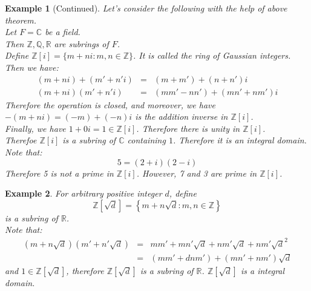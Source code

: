\documentclass{article}
\theoremstyle{MyNonumberplain}
\theoremstyle{break}
\theoremstyle{break}
\newtheorem{example}{Example}[section]
\theoremstyle{break}
\theoremstyle{definition}
\theoremstyle{break}
\begin{document}
\begin{expbox}
    \begin{example}[Continued]
        Let's consider the following with the help of above theorem.\\

        Let $F =\mathbb{C}$ be a field.\\
        
        Then $\mathbb{Z}, \mathbb{Q}, \mathbb{R}$ are subrings of $F$.\\
        
        Define $\mathbb{Z} [i] = \{ m + n i : m, n \in \mathbb{Z} \}$. It is called
        the ring of Gaussian integers. Then we have:
        \begin{eqnarray*}
          (m + n i) + (m' + n' i) & = & (m + m') + (n + n') i\\
          (m + n i) (m' + n' i) & = & (m m' - n n') + (m n' + n m') i
        \end{eqnarray*}
        Therefore the operation is closed, and moreover, we have $- (m + n i) = (- m)
        + (- n) i$ is the addition inverse in $\mathbb{Z} [i]$.\\
        
        Finally, we have $1 + 0 i = 1 \in \mathbb{Z} [i]$. Therefore there is unity in
        $\mathbb{Z} [i]$.\\
        
        Therefoe $\mathbb{Z} [i]$ is a subring of $\mathbb{C}$ containing $1$.
        Therefore it is an integral domain.\\
        
        Note that:
        \[ 5 = (2 + i) (2 - i) \]
        Therefore 5 is not a prime in $\mathbb{Z} [i]$. However, 7 and 3 are prime in
        $\mathbb{Z} [i]$.
    \end{example}
\end{expbox}

\begin{expbox}
    \begin{example}
        For arbitrary positive integer $d$, define
        \[ \mathbb{Z} \left[ \sqrt{d} \right] = \left\{ m + n \sqrt{d} : m, n \in
           \mathbb{Z} \right\} \]
        is a subring of $\mathbb{R}$.\\
        
        Note that:
        \begin{eqnarray*}
          \left( m + n \sqrt{d} \right) \left( m' + n' \sqrt{d} \right) & = & m m' + m
          n' \sqrt{d} + n m' \sqrt{d} + n m' \sqrt{d}^2\\
          & = & (m m' + d n m') + (m n' + n m') \sqrt{d}
        \end{eqnarray*}
        and $1 \in \mathbb{Z} \left[ \sqrt{d} \right]$, therefore $\mathbb{Z} \left[
        \sqrt{d} \right]$ is a subring of $\mathbb{R}$. $\mathbb{Z} \left[ \sqrt{d}
        \right]$ is a integral domain.
    \end{example}
\end{expbox}
\end{document}
